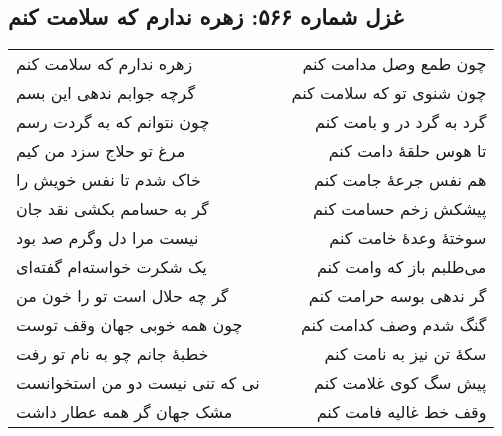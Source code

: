 \begin{center}
\section*{غزل شماره ۵۶۶: زهره ندارم که سلامت کنم}
\label{sec:566}
\begin{longtable}{l p{0.5cm} r}
زهره ندارم که سلامت کنم
&&
چون طمع وصل مدامت کنم
\\
گرچه جوابم ندهی این بسم
&&
چون شنوی تو که سلامت کنم
\\
چون نتوانم که به گردت رسم
&&
گرد به گرد در و بامت کنم
\\
مرغ تو حلاج سزد من کیم
&&
تا هوس حلقهٔ دامت کنم
\\
خاک شدم تا نفس خویش را
&&
هم نفس جرعهٔ جامت کنم
\\
گر به حسامم بکشی نقد جان
&&
پیشکش زخم حسامت کنم
\\
نیست مرا دل وگرم صد بود
&&
سوختهٔ وعدهٔ خامت کنم
\\
یک شکرت خواسته‌ام گفته‌ای
&&
می‌طلبم باز که وامت کنم
\\
گر چه حلال است تو را خون من
&&
گر ندهی بوسه حرامت کنم
\\
چون همه خوبی جهان وقف توست
&&
گنگ شدم وصف کدامت کنم
\\
خطبهٔ جانم چو به نام تو رفت
&&
سکهٔ تن نیز به نامت کنم
\\
نی که تنی نیست دو من استخوانست
&&
پیش سگ کوی غلامت کنم
\\
مشک جهان گر همه عطار داشت
&&
وقف خط غالیه فامت کنم
\\
\end{longtable}
\end{center}
